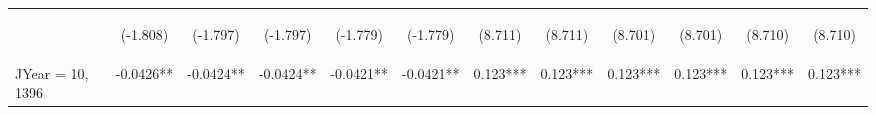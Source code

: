 \documentclass[]{article}
\begin{document}
\begin{center}
\begin{tabular}{lccccccccccc}
        \vspace{4pt}     & \begin{footnotesize}(-1.808)\end{footnotesize} & \begin{footnotesize}(-1.797)\end{footnotesize} & \begin{footnotesize}(-1.797)\end{footnotesize} & \begin{footnotesize}(-1.779)\end{footnotesize} & \begin{footnotesize}(-1.779)\end{footnotesize} & \begin{footnotesize}(8.711)\end{footnotesize}   & \begin{footnotesize}(8.711)\end{footnotesize}   & \begin{footnotesize}(8.701)\end{footnotesize}  & \begin{footnotesize}(8.701)\end{footnotesize}  & \begin{footnotesize}(8.710)\end{footnotesize}  & \begin{footnotesize}(8.710)\end{footnotesize}  \\
        JYear = 10, 1396 & -0.0426**                                      & -0.0424**                                      & -0.0424**                                      & -0.0421**                                      & -0.0421**                                      & 0.123***                                        & 0.123***                                        & 0.123***                                       & 0.123***                                       & 0.123***                                       & 0.123***                                       \\

\end{tabular}
\end{center}
\end{document}
